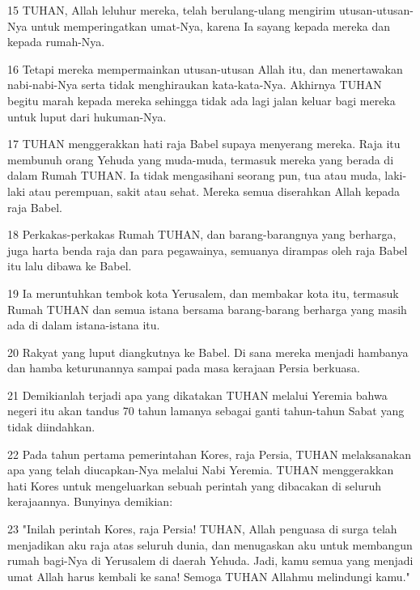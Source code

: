 \par 15 TUHAN, Allah leluhur mereka, telah berulang-ulang mengirim utusan-utusan-Nya untuk memperingatkan umat-Nya, karena Ia sayang kepada mereka dan kepada rumah-Nya.
\par 16 Tetapi mereka mempermainkan utusan-utusan Allah itu, dan menertawakan nabi-nabi-Nya serta tidak menghiraukan kata-kata-Nya. Akhirnya TUHAN begitu marah kepada mereka sehingga tidak ada lagi jalan keluar bagi mereka untuk luput dari hukuman-Nya.
\par 17 TUHAN menggerakkan hati raja Babel supaya menyerang mereka. Raja itu membunuh orang Yehuda yang muda-muda, termasuk mereka yang berada di dalam Rumah TUHAN. Ia tidak mengasihani seorang pun, tua atau muda, laki-laki atau perempuan, sakit atau sehat. Mereka semua diserahkan Allah kepada raja Babel.
\par 18 Perkakas-perkakas Rumah TUHAN, dan barang-barangnya yang berharga, juga harta benda raja dan para pegawainya, semuanya dirampas oleh raja Babel itu lalu dibawa ke Babel.
\par 19 Ia meruntuhkan tembok kota Yerusalem, dan membakar kota itu, termasuk Rumah TUHAN dan semua istana bersama barang-barang berharga yang masih ada di dalam istana-istana itu.
\par 20 Rakyat yang luput diangkutnya ke Babel. Di sana mereka menjadi hambanya dan hamba keturunannya sampai pada masa kerajaan Persia berkuasa.
\par 21 Demikianlah terjadi apa yang dikatakan TUHAN melalui Yeremia bahwa negeri itu akan tandus 70 tahun lamanya sebagai ganti tahun-tahun Sabat yang tidak diindahkan.
\par 22 Pada tahun pertama pemerintahan Kores, raja Persia, TUHAN melaksanakan apa yang telah diucapkan-Nya melalui Nabi Yeremia. TUHAN menggerakkan hati Kores untuk mengeluarkan sebuah perintah yang dibacakan di seluruh kerajaannya. Bunyinya demikian:
\par 23 "Inilah perintah Kores, raja Persia! TUHAN, Allah penguasa di surga telah menjadikan aku raja atas seluruh dunia, dan menugaskan aku untuk membangun rumah bagi-Nya di Yerusalem di daerah Yehuda. Jadi, kamu semua yang menjadi umat Allah harus kembali ke sana! Semoga TUHAN Allahmu melindungi kamu."


